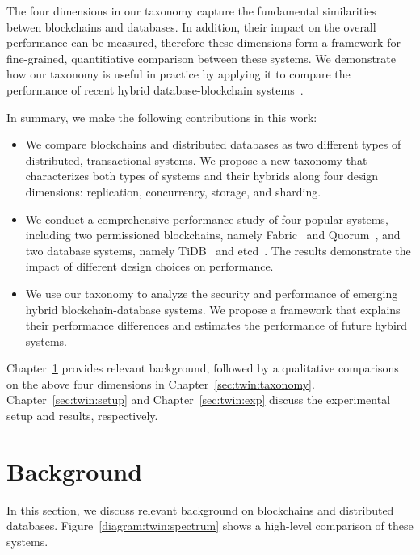 The four dimensions in our taxonomy capture the fundamental
similarities betwen blockchains and databases. In addition, their impact on the
overall performance can be measured, therefore these dimensions form a framework
for fine-grained, quantitiative comparison between these systems. We demonstrate
how our taxonomy is useful in practice by applying it to compare the performance
of recent hybrid database-blockchain
systems~\cite{BlockchainMeetsDatabase,peng2020falcondb,veritas,el2019blockchaindb,mcconaghy2016bigchaindb,schuhknecht2019chainifydb}.

In summary, we make the following contributions in this work:
\begin{itemize}
  \item We compare blockchains and distributed databases as two different types
  of distributed, transactional systems. We propose a new taxonomy that
  characterizes both types of systems and their hybrids along four
  design dimensions: replication, concurrency, storage, and sharding.

  \item We conduct a comprehensive performance study of four popular systems,
  including two permissioned blockchains, namely Fabric~\cite{web:fabric} and
  Quorum~\cite{web:quorum}, and two database systems, namely
  TiDB~\cite{web:tidb} and etcd~\cite{web:etcd}. The results demonstrate the
  impact of different design choices on performance.
   
  \item We use our taxonomy to analyze the security and performance of emerging
  hybrid blockchain-database systems. We propose a framework that explains their
  performance differences and estimates the performance of future hybird
  systems.
\end{itemize}

Chapter~\ref{sec:twin:background} provides relevant background, followed by a qualitative comparisons on the above
four dimensions in Chapter~\ref{sec:twin:taxonomy}. Chapter~\ref{sec:twin:setup} and Chapter~\ref{sec:twin:exp} discuss the experimental setup and
results, respectively. 



\section{Background}
\label{sec:twin:background}

In this section, we discuss relevant background on blockchains and distributed databases.
Figure~\ref{diagram:twin:spectrum} shows a high-level comparison of these systems.

